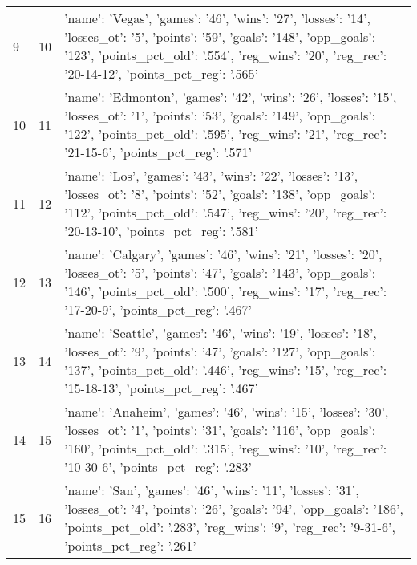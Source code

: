 \begin{tabular}{lrl}
9 & 10 & {'name': 'Vegas', 'games': '46', 'wins': '27', 'losses': '14', 'losses_ot': '5', 'points': '59', 'goals': '148', 'opp_goals': '123', 'points_pct_old': '.554', 'reg_wins': '20', 'reg_rec': '20-14-12', 'points_pct_reg': '.565'} \\
10 & 11 & {'name': 'Edmonton', 'games': '42', 'wins': '26', 'losses': '15', 'losses_ot': '1', 'points': '53', 'goals': '149', 'opp_goals': '122', 'points_pct_old': '.595', 'reg_wins': '21', 'reg_rec': '21-15-6', 'points_pct_reg': '.571'} \\
11 & 12 & {'name': 'Los', 'games': '43', 'wins': '22', 'losses': '13', 'losses_ot': '8', 'points': '52', 'goals': '138', 'opp_goals': '112', 'points_pct_old': '.547', 'reg_wins': '20', 'reg_rec': '20-13-10', 'points_pct_reg': '.581'} \\
12 & 13 & {'name': 'Calgary', 'games': '46', 'wins': '21', 'losses': '20', 'losses_ot': '5', 'points': '47', 'goals': '143', 'opp_goals': '146', 'points_pct_old': '.500', 'reg_wins': '17', 'reg_rec': '17-20-9', 'points_pct_reg': '.467'} \\
13 & 14 & {'name': 'Seattle', 'games': '46', 'wins': '19', 'losses': '18', 'losses_ot': '9', 'points': '47', 'goals': '127', 'opp_goals': '137', 'points_pct_old': '.446', 'reg_wins': '15', 'reg_rec': '15-18-13', 'points_pct_reg': '.467'} \\
14 & 15 & {'name': 'Anaheim', 'games': '46', 'wins': '15', 'losses': '30', 'losses_ot': '1', 'points': '31', 'goals': '116', 'opp_goals': '160', 'points_pct_old': '.315', 'reg_wins': '10', 'reg_rec': '10-30-6', 'points_pct_reg': '.283'} \\
15 & 16 & {'name': 'San', 'games': '46', 'wins': '11', 'losses': '31', 'losses_ot': '4', 'points': '26', 'goals': '94', 'opp_goals': '186', 'points_pct_old': '.283', 'reg_wins': '9', 'reg_rec': '9-31-6', 'points_pct_reg': '.261'} \\
\end{tabular}



